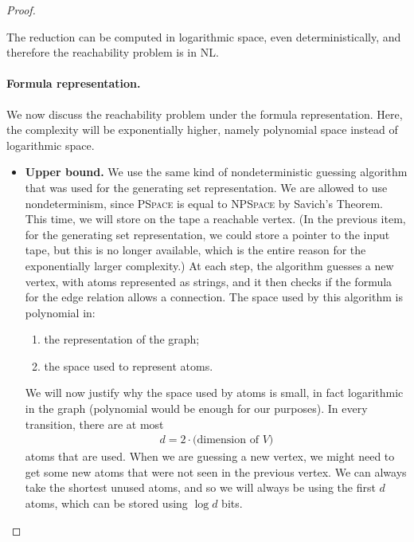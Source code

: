 \begin{proof}
\begin{itemize}
    The reduction can be computed in logarithmic space, even deterministically, and therefore the reachability problem is in \textsc{NL}.

\end{itemize}


\paragraph*{Formula representation.}  We now discuss the reachability problem under  the formula representation. Here,  the complexity will be exponentially higher, namely polynomial space instead of logarithmic space. 

\begin{itemize}
    \item \textbf{Upper bound.} We use the same kind of  nondeterministic guessing algorithm that was used for the generating set representation. We are allowed to use nondeterminism, since \textsc{PSpace} is equal to \textsc{NPSpace} by Savich's Theorem.   This time, we will store on the tape a reachable vertex. (In the previous item, for the generating set representation, we could store a pointer to the input tape, but this is no longer available, which is the entire reason for  the exponentially larger complexity.)  At each step, the algorithm guesses a new vertex, with atoms represented as strings, and it then checks if the formula for the edge relation allows a connection. The space used by this algorithm is polynomial in: 
    \begin{enumerate}
        \item the representation of the graph;
        \item the space used to represent atoms.
    \end{enumerate}
    We will now justify why the space used by atoms is small, in fact logarithmic in the graph (polynomial would be enough for our purposes).  In every transition, there are at most 
    \begin{align*}
    d  = 2 \cdot \text{(dimension of $V$)}
    \end{align*}
    atoms that are used. When we are guessing a new vertex, we might need to get some new atoms that were not seen in the previous vertex. We can always take the shortest unused atoms, and so we will always be using the first $d$ atoms, which can be stored using $\log d$ bits.


\end{itemize}
\end{proof}
